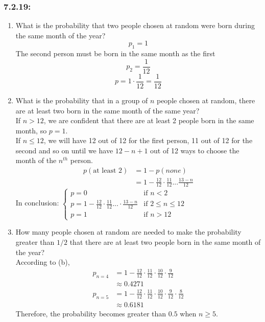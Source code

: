 \documentclass[a4paper]{article}
\begin{document}
	\subsubsection*{7.2.19:}
	\begin{enumerate}[label=\alph*)]
	    \item What is the probability that two people chosen at random were born during the same month of the year?
	    \begin{equation*}
	        p_1 = 1
	    \end{equation*}
	    The second person must be born in the same month as the first
	    \begin{equation*}
	        p_2 = \frac{1}{12}
	    \end{equation*}
	    \begin{equation*}
	        p = 1\cdot\frac{1}{12}=\frac{1}{12}
	    \end{equation*}
	    \item What is the probability that in a group of $n$ people chosen at random, there are at least two born in the same month of the same year? \\
	    If $n>12$, we are confident that there are at least 2 people born in the same month, so $p=1$. \\
	    If $n\leq12$, we will have 12 out of 12 for the first person, 11 out of 12 for the second and so on until we have $12-n+1$ out of 12 ways to choose the month of the $n^{th}$ person.
	    \begin{align*}
	        p(\text{at least 2}) & = 1 - p(none) \\
	        & = 1-\frac{12}{12}\cdot \frac{11}{12}...\frac{13-n}{12}
	    \end{align*}
	    In conclusion:
	    $\begin{cases}
	    p=0 & \text{if } n<2 \\
	    p = 1-\frac{12}{12}\cdot \frac{11}{12}...\cdot \frac{13-n}{12} & \text{if } 2\leq n\leq12 \\
	    p = 1 & \text{if } n>12
	    \end{cases}$
	    \item How many people chosen at random are needed to make the probability greater than $1/2$ that there are at least two people born in the same month of the year? \\
	    According to (b),
	    \begin{align*}
	        p_{n=4} & = 1-\frac{12}{12}\cdot \frac{11}{12}\cdot \frac{10}{12}\cdot \frac{9}{12} \\
	        & \approx 0.4271 \\
	        p_{n=5} & = 1-\frac{12}{12}\cdot \frac{11}{12}\cdot \frac{10}{12}\cdot \frac{9}{12}\cdot \frac{8}{12} \\
	        & \approx 0.6181
	        \end{align*}
	        Therefore, the probability becomes greater than $0.5$ when $n\geq5$.
	    \end{enumerate}
	
\end{document}
